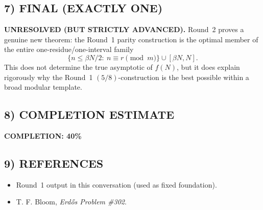 \subsection*{7) FINAL (EXACTLY ONE)}
\textbf{UNRESOLVED (BUT STRICTLY ADVANCED).}
Round~2 proves a genuine new theorem: the Round~1 parity construction is the optimal member of the entire one-residue/one-interval family
\[
  \{n\le \beta N/2:\ n\equiv r\pmod m\}\cup [\beta N,N].
\]
This does not determine the true asymptotic of \(f(N)\), but it does explain rigorously why the Round~1 \((5/8)\)-construction is the best possible within a broad modular template.

\subsection*{8) COMPLETION ESTIMATE}
\textbf{COMPLETION: 40\%}

\subsection*{9) REFERENCES}
\begin{itemize}
\item Round~1 output in this conversation (used as fixed foundation).
\item T. F. Bloom, \emph{Erd\H{o}s Problem \#302}.
\end{itemize}


